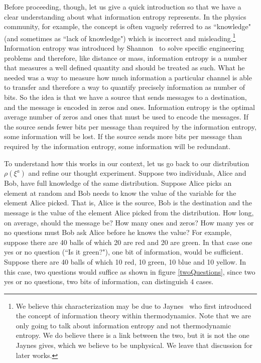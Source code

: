 \documentclass[11pt]{elsarticle}
\begin{document}
Before proceeding, though, let us give a quick introduction so that we have a clear understanding about what information entropy represents. In the physics community, for example, the concept is often vaguely referred to as ``knowledge" (and sometimes as ``lack of knowledge") which is incorrect and misleading.\footnote{We believe this characterization may be due to Jaynes~\cite{Jaynes} who first introduced the concept of information theory within thermodynamics. Note that we are only going to talk about information entropy and not thermodynamic entropy. We do believe there is a link between the two, but it is not the one Jaynes gives, which we believe to be unphysical. We leave that discussion for later works.} Information entropy was introduced by Shannon~\cite{Shannon} to solve specific engineering problems and therefore, like distance or mass, information entropy is a number that measures a well defined quantity and should be treated as such. What he needed was a way to measure how much information a particular channel is able to transfer and therefore a way to quantify precisely information as number of bits. So the idea is that we have a source that sends messages to a destination, and the message is encoded in zeros and ones. Information entropy is the optimal average number of zeros and ones that must be used to encode the messages. If the source sends fewer bits per message than required by the information entropy, some information will be lost. If the source sends more bits per message than required by the information entropy, some information will be redundant.

To understand how this works in our context, let us go back to our distribution $\rho(\xi^a)$ and refine our thought experiment. Suppose two individuals, Alice and Bob, have full knowledge of the same distribution. Suppose Alice picks an element at random and Bob needs to know the value of the variable for the element Alice picked. That is, Alice is the source, Bob is the destination and the message is the value of the element Alice picked from the distribution. How long, on average, should the message be? How many ones and zeros? How many yes or no questions must Bob ask Alice before he knows the value? For example, suppose there are 40 balls of which 20 are red and 20 are green. In that case one yes or no question (``Is it green?"), one bit of information, would be sufficient. Suppose there are 40 balls of which 10 red, 10 green, 10 blue and 10 yellow. In this case, two questions would suffice as shown in figure \ref{twoQuestions}, since two yes or no questions, two bits of information, can distinguish 4 cases.
\end{document}

